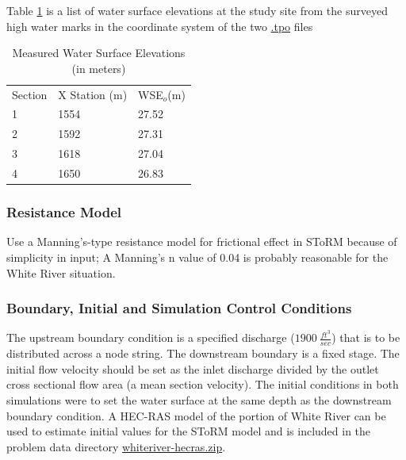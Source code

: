 \documentclass[12pt]{article}
\begin{document}
Table \ref{tab:white-river-results} is a list of water surface elevations at the study site from the surveyed high water marks in the coordinate system of the two \url{.tpo} files

\begin{table}[ht!]
   \centering
      \caption{Measured Water Surface Elevations (in meters)}
   \begin{tabular}{p{1in} p{1in} p{1in}  }
   Section & X Station (m)  & WSE$_{o} $(m)\\
   1 & 1554 & 27.52 \\
   2 & 1592 & 27.31 \\
   3 & 1618 & 27.04  \\
   4 & 1650 & 26.83  \\
   \end{tabular}
\label{tab:white-river-results}
\end{table}

\subsubsection*{Resistance Model}
Use a Manning's-type resistance model for frictional effect in SToRM because of simplicity in input; A Manning's n value of 0.04 is probably reasonable for the White River situation.
\subsubsection*{Boundary, Initial and Simulation Control Conditions}
The upstream boundary condition is a specified discharge ($1900~\frac{ft^3}{sec}$) that is to be distributed across a node string. 
The downstream boundary is a fixed stage.
The initial flow velocity should be set as the inlet discharge divided by the outlet cross sectional flow area (a  mean section velocity).  
The initial conditions in both simulations were to set the water surface at the same depth as the downstream boundary condition.   
A HEC-RAS model of the portion of White River can be used to estimate initial values for the SToRM model and is included in the problem data directory \url{whiteriver-hecras.zip}.
\end{document}
